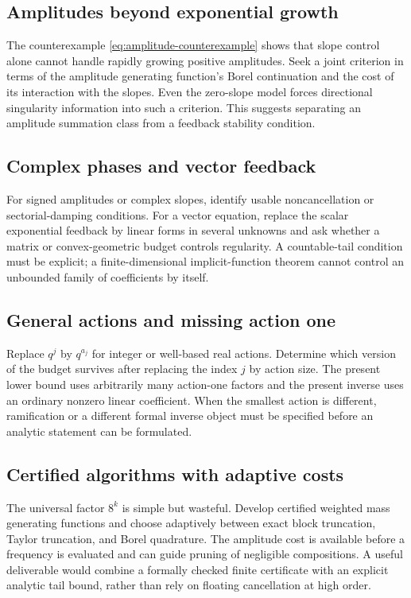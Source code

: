 \documentclass[11pt,a4paper]{article}
\numberwithin{equation}{section}
\theoremstyle{definition}
\theoremstyle{remark}
\theoremstyle{definition}
\begin{document}
\subsection{Amplitudes beyond exponential growth}
The counterexample \eqref{eq:amplitude-counterexample} shows that slope
control alone cannot handle rapidly growing positive amplitudes. Seek a
joint criterion in terms of the amplitude generating function's Borel
continuation and the cost of its interaction with the slopes. Even the
zero-slope model forces directional singularity information into such
a criterion. This suggests separating an amplitude summation class from
a feedback stability condition.

\subsection{Complex phases and vector feedback}
For signed amplitudes or complex slopes, identify usable
noncancellation or sectorial-damping conditions. For a vector equation,
replace the scalar exponential feedback by linear forms in several
unknowns and ask whether a matrix or convex-geometric budget controls
regularity. A countable-tail condition must be explicit; a finite-dimensional
implicit-function theorem cannot control an unbounded family of
coefficients by itself.

\subsection{General actions and missing action one}
Replace $q^j$ by $q^{a_j}$ for integer or well-based real actions.
Determine which version of the budget survives after replacing the
index $j$ by action size. The present lower bound uses arbitrarily many
action-one factors and the present inverse uses an ordinary nonzero
linear coefficient. When the smallest action is different, ramification
or a different formal inverse object must be specified before an
analytic statement can be formulated.

\subsection{Certified algorithms with adaptive costs}
The universal factor $8^k$ is simple but wasteful. Develop certified
weighted mass generating functions and choose adaptively between exact
block truncation, Taylor truncation, and Borel quadrature. The amplitude
cost is available before a frequency is evaluated and can guide
pruning of negligible compositions. A useful deliverable would combine
a formally checked finite certificate with an explicit analytic tail
bound, rather than rely on floating cancellation at high order.
\end{document}
